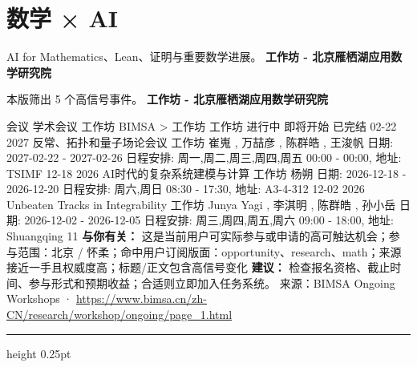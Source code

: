 \documentclass[10.5pt]{ctexart}
\begin{document}
\section*{数学 × AI}
{\color{ormuted} AI for Mathematics、Lean、证明与重要数学进展。}
\vspace{2mm}
{\LARGE\bfseries 工作坊 - 北京雁栖湖应用数学研究院}\par
\vspace{1mm}
{\color{ormuted} 本版筛出 5 个高信号事件。}
\vspace{3mm}
{\Large\bfseries 工作坊 - 北京雁栖湖应用数学研究院}\par
会议 学术会议 工作坊 BIMSA > 工作坊 工作坊 进行中 即将开始 已完结 02-22 2027 反常、拓扑和量子场论会议 工作坊 崔嵬 , 万喆彦 , 陈群皓 , 王浚帆 日期: 2027-02-22 - 2027-02-26 日程安排: 周一,周二,周三,周四,周五 00:00 - 00:00, 地址: TSIMF 12-18 2026 AI时代的复杂系统建模与计算 工作坊 杨朔 日期: 2026-12-18 - 2026-12-20 日程安排: 周六,周日 08:30 - 17:30, 地址: A3-4-312 12-02 2026 Unbeaten Tracks in Integrability 工作坊 Junya Yagi , 李淇明 , 陈群皓 , 孙小岳 日期: 2026-12-02 - 2026-12-05 日程安排: 周三,周四,周五,周六 09:00 - 18:00, 地址: Shuangqing 11
\textbf{与你有关：} 这是当前用户可实际参与或申请的高可触达机会；参与范围：北京 / 怀柔；命中用户订阅版面：opportunity、research、math；来源接近一手且权威度高；标题/正文包含高信号变化
\textbf{建议：} 检查报名资格、截止时间、参与形式和预期收益；合适则立即加入任务系统。
{\footnotesize\color{ormuted} 来源：BIMSA Ongoing Workshops · \url{https://www.bimsa.cn/zh-CN/research/workshop/ongoing/page_1.html}}
\vspace{4mm}
\hrule height 0.25pt
\vspace{3mm}
\end{document}
